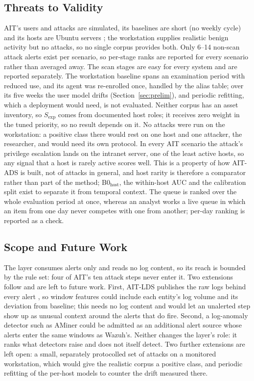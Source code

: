 \documentclass[conference]{IEEEtran}
\begin{document}
\subsection{Threats to Validity}
\label{sec:threats}

AIT's users and attacks are simulated, its baselines are short (no weekly cycle) and its hosts are Ubuntu servers \cite{ref22}; the workstation supplies realistic benign activity but no attacks, so no single corpus provides both. Only 6--14 non-scan attack alerts exist per scenario, so per-stage ranks are reported for every scenario rather than averaged away. The scan stages are easy for every system and are reported separately. The workstation baseline spans an examination period with reduced use, and its agent was re-enrolled once, handled by the alias table; over its five weeks the user model drifts (Section~\ref{sec:prelim}), and periodic refitting, which a deployment would need, is not evaluated. Neither corpus has an asset inventory, so $S_\mathrm{exp}$ comes from documented host roles; it receives zero weight in the tuned priority, so no result depends on it. No attacks were run on the workstation: a positive class there would rest on one host and one attacker, the researcher, and would need its own protocol. In every AIT scenario the attack's privilege escalation lands on the intranet server, one of the least active hosts, so any signal that a host is rarely active scores well. This is a property of how AIT-ADS is built, not of attacks in general, and host rarity is therefore a comparator rather than part of the method; B0$_\mathrm{host}$, the within-host AUC and the calibration split exist to separate it from temporal context. The queue is ranked over the whole evaluation period at once, whereas an analyst works a live queue in which an item from one day never competes with one from another; per-day ranking is reported as a check.

\subsection{Scope and Future Work}

The layer consumes alerts only and reads no log content, so its reach is bounded by the rule set: four of AIT's ten attack steps never enter it. Two extensions follow and are left to future work. First, AIT-LDS publishes the raw logs behind every alert \cite{ref22}, so window features could include each entity's log volume and its deviation from baseline; this needs no log content and would let an unalerted step show up as unusual context around the alerts that do fire. Second, a log-anomaly detector such as AMiner could be admitted as an additional alert source whose alerts enter the same windows as Wazuh's. Neither changes the layer's role: it ranks what detectors raise and does not itself detect. Two further extensions are left open: a small, separately protocolled set of attacks on a monitored workstation, which would give the realistic corpus a positive class, and periodic refitting of the per-host models to counter the drift measured there.
\end{document}

